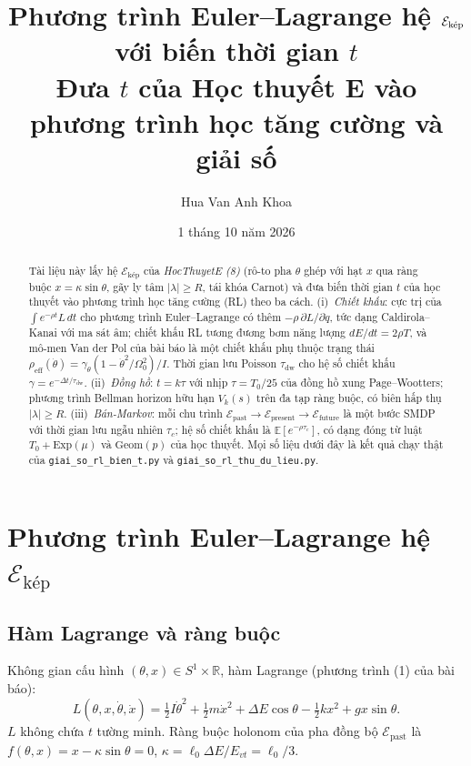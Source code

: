 \documentclass[11pt,a4paper]{article}
\title{Phương trình Euler--Lagrange hệ $\Edual$ với biến thời gian $t$\\[2pt]
\large Đưa $t$ của Học thuyết E vào phương trình học tăng cường và giải số}
\author{Hua Van Anh Khoa}
\date{1 tháng 10 năm 2026}
\newcommand{\Edual}{\mathcal{E}_{\text{kép}}}
\newcommand{\Epast}{\mathcal{E}_{\text{past}}}
\newcommand{\Epres}{\mathcal{E}_{\text{present}}}
\newcommand{\Efut}{\mathcal{E}_{\text{future}}}
\newcommand{\E}{\mathbb{E}}
\theoremstyle{remark}
\begin{document}
\maketitle

\begin{abstract}
Tài liệu này lấy hệ $\Edual$ của \emph{HocThuyetE (8)} (rô-to pha $\theta$ ghép với hạt $x$ qua ràng buộc $x=\kappa\sin\theta$, gãy ly tâm $|\lambda|\ge R$, tái khóa Carnot) và đưa biến thời gian $t$ của học thuyết vào phương trình học tăng cường (RL) theo ba cách. (i)~\emph{Chiết khấu}: cực trị của $\int e^{-\rho t}L\,dt$ cho phương trình Euler--Lagrange có thêm $-\rho\,\partial L/\partial\dot q$, tức dạng Caldirola--Kanai với ma sát âm; chiết khấu RL tương đương bơm năng lượng $dE/dt=2\rho T$, và mô-men Van der Pol của bài báo là một chiết khấu phụ thuộc trạng thái $\rho_{\text{eff}}(\dot\theta)=\gamma_\theta(1-\dot\theta^2/\Omega_0^2)/I$. Thời gian lưu Poisson $\tau_{\text{dw}}$ cho hệ số chiết khấu $\gamma=e^{-\Delta t/\tau_{\text{dw}}}$. (ii)~\emph{Đồng hồ}: $t=k\tau$ với nhịp $\tau=T_0/25$ của đồng hồ xung Page--Wootters; phương trình Bellman horizon hữu hạn $V_k(s)$ trên đa tạp ràng buộc, có biên hấp thụ $|\lambda|\ge R$. (iii)~\emph{Bán-Markov}: mỗi chu trình $\Epast\to\Epres\to\Efut$ là một bước SMDP với thời gian lưu ngẫu nhiên $\tau_c$; hệ số chiết khấu là $\E[e^{-\rho\tau_c}]$, có dạng đóng từ luật $T_0+\mathrm{Exp}(\mu)$ và $\mathrm{Geom}(p)$ của học thuyết. Mọi số liệu dưới đây là kết quả chạy thật của \texttt{giai\_so\_rl\_bien\_t.py} và \texttt{giai\_so\_rl\_thu\_du\_lieu.py}.
\end{abstract}

\section{Phương trình Euler--Lagrange hệ $\Edual$}
\subsection{Hàm Lagrange và ràng buộc}
Không gian cấu hình $(\theta,x)\in S^1\times\mathbb R$, hàm Lagrange (phương trình (1) của bài báo):
\begin{equation}
L(\theta,x,\dot\theta,\dot x)=\tfrac12I\dot\theta^2+\tfrac12m\dot x^2+\Delta E\cos\theta-\tfrac12kx^2+gx\sin\theta .
\label{eq:L}
\end{equation}
$L$ không chứa $t$ tường minh. Ràng buộc holonom của pha đồng bộ $\Epast$ là $f(\theta,x)=x-\kappa\sin\theta=0$, $\kappa=\ell_0\Delta E/E_{vt}=\ell_0/3$.
\end{document}
